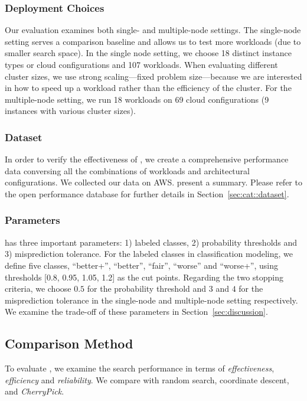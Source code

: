 \subsubsection*{Deployment Choices}
Our evaluation examines both single- and multiple-node settings.
The single-node setting serves a comparison baseline and allows us to test more workloads (due to smaller search space).
In the single node setting,
we choose 18 distinct instance types or cloud configurations and 107 workloads.
When evaluating different cluster sizes,
we use strong scaling---fixed problem size---because we are interested in how to speed up a workload rather than the efficiency of the cluster.
For the multiple-node setting, we run 18 workloads
on 69 cloud configurations (9 instances with various cluster sizes).

\subsubsection*{Dataset}
In order to verify the effectiveness of \scout,
we create a comprehensive performance data conversing all the combinations of
workloads and architectural configurations.
We collected our data on AWS.
\mytable{\ref{tab:dataset_overview}} present a summary.
Please refer to the open performance database for further details in Section~\ref{sec:cat::dataset}.


\subsubsection*{Parameters}
\scout has three important parameters:
1) labeled classes, 2) probability thresholds and 3) misprediction tolerance.
For the labeled classes in classification modeling,
we define five classes,
``better+'', ``better'',  ``fair'', ``worse'' and ``worse+'',
using thresholds [0.8, 0.95, 1.05, 1.2] as the cut points.
Regarding the two stopping criteria,
we choose $0.5$ for the probability threshold and
$3$ and $4$ for the misprediction tolerance
in the single-node and multiple-node setting respectively.
We examine the trade-off of these parameters in Section~\ref{sec:discussion}.

\subsection{Comparison Method}
To evaluate \scout, we examine the search performance
in terms of \emph{effectiveness}, \emph{efficiency} and \emph{reliability}.
We compare \scout with random search, coordinate descent, and \emph{CherryPick}.

